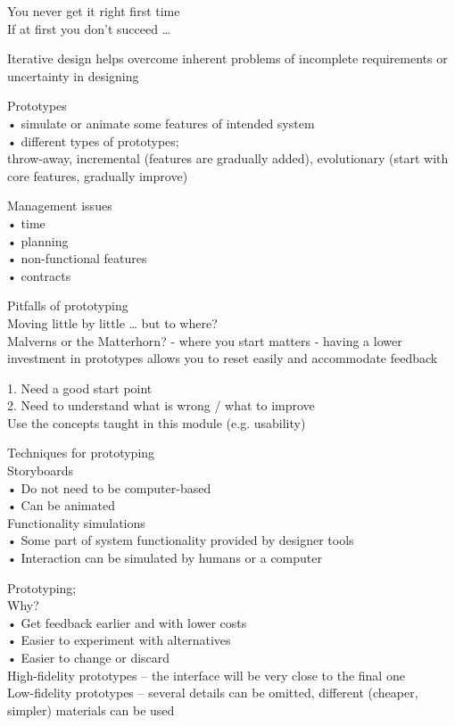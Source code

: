 \documentclass[]{project_plan}
\begin{document}
You never get it right first time\\
If at first you don’t succeed …

Iterative design helps overcome inherent problems of
incomplete requirements or uncertainty in designing

Prototypes\\
• simulate or animate some features of intended system\\
• different types of prototypes;\\
throw-away, incremental (features are gradually added), evolutionary (start with core features, gradually improve)

Management issues\\
• time\\
• planning\\
• non-functional features\\
• contracts

Pitfalls of prototyping\\
Moving little by little … but to where?\\
Malverns or the Matterhorn? - where you start matters -
having a lower investment in prototypes allows you to reset easily and accommodate feedback

1. Need a good start point\\
2. Need to understand what is wrong / what to improve\\
Use the concepts taught in this module (e.g. usability)

Techniques for prototyping\\
Storyboards\\
• Do not need to be computer-based\\
• Can be animated\\
Functionality simulations\\
• Some part of system functionality provided by designer tools\\
• Interaction can be simulated by humans or a computer

Prototyping;\\
Why?\\
• Get feedback earlier and with lower costs\\
• Easier to experiment with alternatives\\
• Easier to change or discard\\

High-fidelity prototypes – the interface will be very close to the final one\\
Low-fidelity prototypes – several details can be omitted, different (cheaper, simpler) materials can
be used
\end{document}

